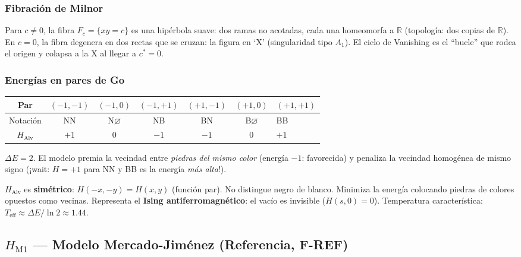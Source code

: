 \documentclass[11pt,a4paper]{article}
\newcommand{\R}{\mathbb{R}}
\newcommand{\dE}{\Delta E}
\begin{document}
\subsubsection*{Fibración de Milnor}

Para $c\neq 0$, la fibra $F_c = \{xy=c\}$ es una hipérbola suave: dos ramas
no acotadas, cada una homeomorfa a $\R$ (topología: dos copias de $\R$).
En $c=0$, la fibra degenera en dos rectas que se cruzan: la figura en `X'
(singularidad tipo $A_1$). El ciclo de Vanishing es el ``bucle'' que
rodea el origen y colapsa a la X al llegar a $c^*=0$.

\subsubsection*{Energías en pares de Go}

\begin{center}
\begin{tabular}{cccccc}
  \toprule
  Par & $(-1,-1)$ & $(-1,0)$ & $(-1,+1)$ & $(+1,-1)$ & $(+1,0)$ & $(+1,+1)$ \\
  \midrule
  Notación & NN & N$\varnothing$ & NB & BN & B$\varnothing$ & BB \\
  $H_{\text{Alv}}$ & $+1$ & $0$ & $-1$ & $-1$ & $0$ & $+1$ \\
  \bottomrule
\end{tabular}
\end{center}

$\dE=2$. El modelo premia la vecindad entre \emph{piedras del mismo color}
(energía $-1$: favorecida) y penaliza la vecindad homogénea de mismo signo
(¡wait: $H=+1$ para NN y BB es la energía \emph{más alta}!).

\begin{tcolorbox}[notebox,title={Lectura estratégica}]
$H_{\text{Alv}}$ es \textbf{simétrico}: $H(-x,-y)=H(x,y)$ (función par).
No distingue negro de blanco.
Minimiza la energía colocando piedras de colores opuestos como vecinas.
Representa el \textbf{Ising antiferromagnético}: el vacío es invisible ($H(s,0)=0$).
Temperatura característica: $T_{\text{eff}} \approx \dE/\ln 2 \approx 1.44$.
\end{tcolorbox}

\subsection{\texorpdfstring{$H_{\text{M1}}$}{H\_M1} --- Modelo Mercado-Jiménez (Referencia, F-REF)}
\end{document}

